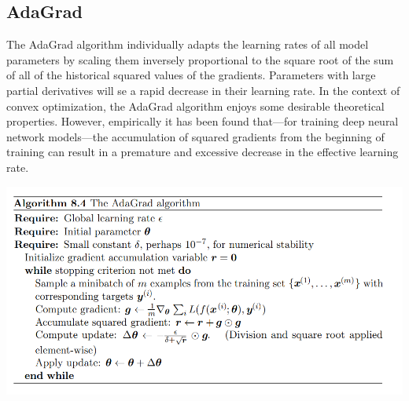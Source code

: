 \subsection{AdaGrad}
The AdaGrad algorithm individually adapts the learning rates of all model parameters by scaling them inversely proportional to the square root of the sum of all of the historical squared values of the gradients. Parameters with large partial derivatives will se a rapid decrease in their learning rate.\newline\newline
In the context of convex optimization, the AdaGrad algorithm enjoys some desirable theoretical properties. However, empirically it has been found that—for training deep neural network models—the accumulation of squared gradients from
the beginning of training can result in a premature and excessive decrease in the effective learning rate.
\begin{center}
    \includegraphics[scale=0.7]{images/AdaGrad.png}
\end{center}

